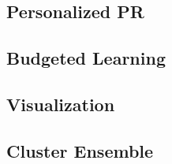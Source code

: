 \documentclass[11pt,a4paper]{article}
\begin{document}
\subsection{Personalized PR}

\subsection{Budgeted Learning}

\subsection{Visualization}

\subsection{Cluster Ensemble}


\end{document}
